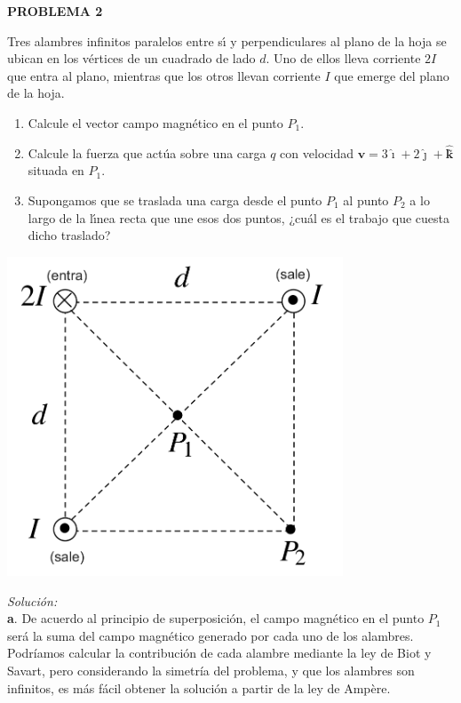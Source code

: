 \textbf{PROBLEMA 2}
\vspace{20px}

\newcommand{\ivec}{\boldsymbol{\hat{\imath}}}
\newcommand{\jvec}{\boldsymbol{\hat{\jmath}}}
\newcommand{\kvec}{\boldsymbol{\hat{k}}}

Tres alambres infinitos paralelos entre sı́ y perpendiculares al plano de la hoja se ubican en los vértices de
un cuadrado de lado $d$. Uno de ellos lleva corriente $2I$ que entra al plano, mientras que los otros llevan corriente
$I$ que emerge del plano de la hoja.\\

\begin{enumerate}[label=\alph*.]
    \item Calcule el vector campo magnético en el punto $P_1$.
    \item Calcule la fuerza que actúa sobre una carga $q$ con velocidad $\mathbf{v} = 3 \ivec
    + 2 \jvec  + \kvec$̃ situada en $P_1$.
    \item Supongamos que se traslada una carga desde el punto $P_1$ al punto $P_2$ a lo largo de la lı́nea recta que une
    esos dos puntos, ¿cuál es el trabajo que cuesta dicho traslado?
\end{enumerate}

\begin{center}
    \includegraphics[width=10cm]{files/img2}
\end{center}

\vspace{20px}
\textit{Solución:}
\\

\textbf{a}. De acuerdo al principio de superposición, el campo magnético en el punto $P_1$ será la suma del campo magnético generado
por cada uno de los alambres. Podríamos calcular la contribución de cada alambre mediante la ley de Biot y Savart,
pero considerando la simetría del problema, y que los alambres son infinitos, es más fácil obtener la solución a partir de la ley
de Ampère.\\

